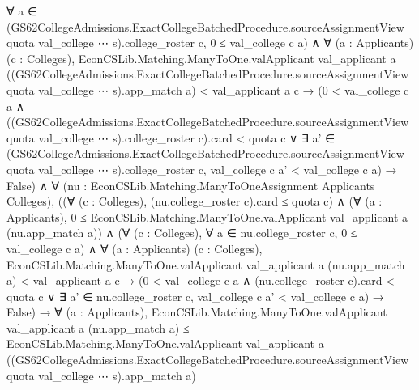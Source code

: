 \documentclass[10pt]{article}
\begin{document}
\begin{ReviewVerbatim}
                        ∀
                          a ∈
                            (GS62CollegeAdmissions.ExactCollegeBatchedProcedure.sourceAssignmentView quota val_college ⋯
                                  s).college_roster
                              c,
                          0 ≤ val_college c a) ∧
                      ∀ (a : Applicants) (c : Colleges),
                        EconCSLib.Matching.ManyToOne.valApplicant val_applicant a
                              ((GS62CollegeAdmissions.ExactCollegeBatchedProcedure.sourceAssignmentView quota
                                    val_college ⋯ s).app_match
                                a) <
                            val_applicant a c →
                          (0 < val_college c a ∧
                                ((GS62CollegeAdmissions.ExactCollegeBatchedProcedure.sourceAssignmentView quota
                                          val_college ⋯ s).college_roster
                                      c).card <
                                  quota c ∨
                              ∃
                                a' ∈
                                  (GS62CollegeAdmissions.ExactCollegeBatchedProcedure.sourceAssignmentView quota
                                        val_college ⋯ s).college_roster
                                    c,
                                val_college c a' < val_college c a) →
                            False) ∧
                ∀ (nu : EconCSLib.Matching.ManyToOneAssignment Applicants Colleges),
                  ((∀ (c : Colleges), (nu.college_roster c).card ≤ quota c) ∧
                      (∀ (a : Applicants),
                          0 ≤ EconCSLib.Matching.ManyToOne.valApplicant val_applicant a (nu.app_match a)) ∧
                        (∀ (c : Colleges), ∀ a ∈ nu.college_roster c, 0 ≤ val_college c a) ∧
                          ∀ (a : Applicants) (c : Colleges),
                            EconCSLib.Matching.ManyToOne.valApplicant val_applicant a (nu.app_match a) <
                                val_applicant a c →
                              (0 < val_college c a ∧ (nu.college_roster c).card < quota c ∨
                                  ∃ a' ∈ nu.college_roster c, val_college c a' < val_college c a) →
                                False) →
                    ∀ (a : Applicants),
                      EconCSLib.Matching.ManyToOne.valApplicant val_applicant a (nu.app_match a) ≤
                        EconCSLib.Matching.ManyToOne.valApplicant val_applicant a
                          ((GS62CollegeAdmissions.ExactCollegeBatchedProcedure.sourceAssignmentView quota val_college ⋯
                                s).app_match
                            a)
\end{ReviewVerbatim}
\end{document}
